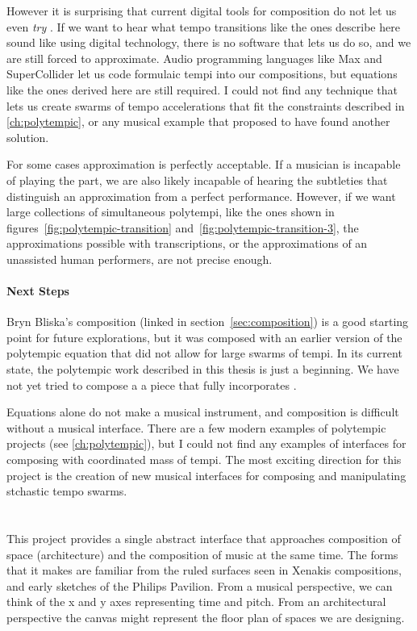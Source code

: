 However it is surprising that current digital tools for composition do
not let us even \emph{try} \polytempic. If we want to hear what tempo
transitions like the ones describe here sound like using digital
technology, there is no software that lets us do so, and we are still
forced to approximate. Audio programming languages like Max and
SuperCollider let us code formulaic tempi into our compositions, but
equations like the ones derived here are still required. I could not
find any technique that lets us create swarms of tempo
accelerations that fit the constraints described in
\autoref{ch:polytempic}, or any musical example that proposed to have
found another solution.

For some cases approximation is perfectly acceptable. If a musician
is incapable of playing the part, we are also likely incapable of
hearing the subtleties that distinguish an approximation from a
perfect performance. However, if we want large collections of
simultaneous polytempi, like the ones shown in
figures~\ref{fig:polytempic-transition}
and~\ref{fig:polytempic-transition-3}, the approximations possible
with transcriptions, or the approximations of an unassisted human
performers, are not precise enough.

\paragraph{Next Steps} Bryn Bliska's composition (linked in
section~\ref{sec:composition}) is a good starting point for future
explorations, but it was composed with an earlier version of the
polytempic equation that did not allow for large swarms of tempi. In
its current state, the polytempic work described in this thesis is
just a beginning. We have not yet tried to compose a a piece that
fully incorporates \polytempic. 

Equations alone do not make a musical instrument, and composition is
difficult without a musical interface. There are a few modern
examples of polytempic projects (see \autoref{ch:polytempic}), but I
could not find any examples of interfaces for composing with
coordinated mass of tempi. The most exciting direction for
this project is the creation of new musical interfaces for composing
and manipulating stchastic tempo swarms. 


\section{}
This project provides a single abstract interface that approaches
composition of space (architecture) and the composition of music at
the same time. The forms that it makes are familiar from the ruled
surfaces seen in Xenakis compositions, and early sketches of the
Philips Pavilion. From a musical perspective, we can think of the x
and y axes representing time and pitch. From an architectural
perspective the canvas might represent the floor plan of spaces we are
designing.

